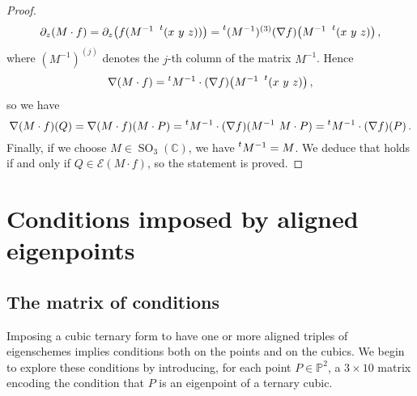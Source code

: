 \documentclass{amsart}
\theoremstyle{plain}
\theoremstyle{definition}
\newcommand{\C}{\mathbb{C}}
\newcommand{\p}{\mathbb{P}}
\newcommand{\SO}{\operatorname{SO}}
\newcommand{\Eig}[1]{\mathcal{E}\!\left( {#1} \right)}
\begin{document}
\begin{proof}
\begin{gather*}
  \partial_z (M\cdot f) = \partial_z \bigl( f(M^{-1} \ \prescript{t} {} (x \ y \ z)) \bigr) = \prescript{t} {}(M^{-1})^{(3)}(\nabla f) \bigl( M^{-1}\ \prescript{t} {} (x \ y \ z) \bigr) \,,
\end{gather*}
%
where $(M^{-1})^{(j)}$ denotes the $j$-th column of the matrix $M^{-1}$. Hence
%
\[
  \nabla (M \cdot f) = \prescript{t} {} M^{-1} \cdot (\nabla f) \bigl(M^{-1}\ \prescript{t} {} (x \ y \ z)\bigr) \,,
\]
%
so we have
%
\[
  \nabla (M \cdot f)(Q)=\nabla (M \cdot f)(M \cdot P)=
  \prescript{t} {} M^{-1} \cdot (\nabla f) (M^{-1}\ M \cdot P)=\prescript{t} {} M^{-1} \cdot (\nabla f)(P) \,.
\]
%
Finally, if we choose $M \in \SO_3(\C)$, we have
$\prescript{t} {} M^{-1}=M$. We deduce that
 holds if and only if $Q \in \Eig{M\cdot f}$, so the statement is proved.
\end{proof}


\section{Conditions imposed by aligned eigenpoints}
\label{conditions}

\subsection{The matrix of conditions}

Imposing a cubic ternary form to have one or more aligned triples of eigenschemes implies conditions both on the points and on the cubics.
We begin to explore these conditions by introducing, for each point
$P \in \p^2$,
a $3 \times 10$ matrix encoding the condition that $P$ is an eigenpoint of a ternary cubic.
\end{document}
